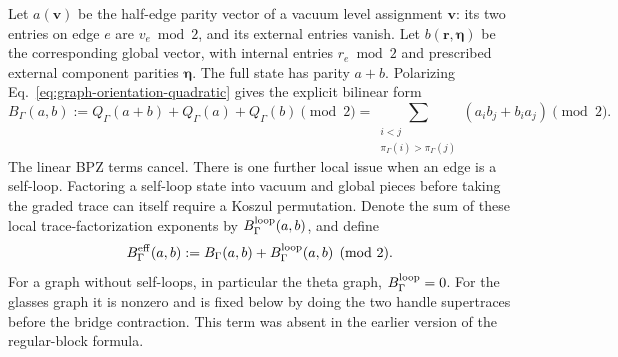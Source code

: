 \documentclass[11pt]{article}
\begin{document}
Let \(a(\bm v)\) be the half-edge parity vector of a vacuum level assignment
\(\bm v\): its two entries on edge \(e\) are \(v_e\bmod2\), and its external
entries vanish.  Let \(b(\bm r,\bm\eta)\) be the corresponding global vector,
with internal entries \(r_e\bmod2\) and prescribed external component
parities \(\bm\eta\).  The full state has parity \(a+b\).  Polarizing
Eq.~\eqref{eq:graph-orientation-quadratic} gives the explicit bilinear form
\begin{equation}
 B_\Gamma(a,b)
 :=Q_\Gamma(a+b)+Q_\Gamma(a)+Q_\Gamma(b)\pmod2
 =\sum_{\substack{i<j\\
       \pi_\Gamma(i)>\pi_\Gamma(j)}}
   (a_i b_j+b_i a_j)\pmod2.
 \label{eq:graph-orientation-polarization}
\end{equation}
The linear BPZ terms cancel.  There is one further local issue when an edge is
a self-loop.  Factoring a self-loop state into vacuum and global pieces before
taking the graded trace can itself require a Koszul permutation.  Denote the
sum of these local trace-factorization exponents by
\(B_\Gamma^{\rm loop}(a,b)\), and define
\begin{equation}
 B_\Gamma^{\rm eff}(a,b)
 :=B_\Gamma(a,b)+B_\Gamma^{\rm loop}(a,b)\pmod2.
 \label{eq:effective-regular-polarization}
\end{equation}
For a graph without self-loops, in particular the theta graph,
\(B_\Gamma^{\rm loop}=0\).  For the glasses graph it is nonzero and is fixed
below by doing the two handle supertraces before the bridge contraction.  This
term was absent in the earlier version of the regular-block formula.
\end{document}

